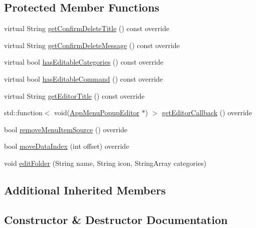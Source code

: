 \subsection*{Protected Member Functions}
\begin{DoxyCompactItemize}
\item 
virtual String \mbox{\hyperlink{classFolderMenuItem_ab3a7232acdc84681c8c31113383471ad}{get\+Confirm\+Delete\+Title}} () const override
\item 
virtual String \mbox{\hyperlink{classFolderMenuItem_ae1961598036e3f731d146257cd556d05}{get\+Confirm\+Delete\+Message}} () const override
\item 
virtual bool \mbox{\hyperlink{classFolderMenuItem_aff205a81de032f9ce018d65391a8d638}{has\+Editable\+Categories}} () const override
\item 
virtual bool \mbox{\hyperlink{classFolderMenuItem_ad38b52ffa7098be2aa8bef09b4013f0e}{has\+Editable\+Command}} () const override
\item 
virtual String \mbox{\hyperlink{classFolderMenuItem_a0cd063b5b374a47a0913ff11c4c1a905}{get\+Editor\+Title}} () const override
\item 
std\+::function$<$ void(\mbox{\hyperlink{classAppMenuPopupEditor}{App\+Menu\+Popup\+Editor}} $\ast$) $>$ \mbox{\hyperlink{classFolderMenuItem_a165416374f830311c0881b568922f9f5}{get\+Editor\+Callback}} () override
\item 
bool \mbox{\hyperlink{classFolderMenuItem_a0cddd7f7e2ac8f27e93861f058ca5094}{remove\+Menu\+Item\+Source}} () override
\item 
bool \mbox{\hyperlink{classFolderMenuItem_a294208ac148dd8af604edea603d9dcf1}{move\+Data\+Index}} (int offset) override
\item 
void \mbox{\hyperlink{classFolderMenuItem_a77305d28e9c8eacbea21e71157f21cf1}{edit\+Folder}} (String name, String icon, String\+Array categories)
\end{DoxyCompactItemize}
\subsection*{Additional Inherited Members}


\subsection{Constructor \& Destructor Documentation}
\mbox{\label{classFolderMenuItem_aa9047739dfc7d9a9c4a88403e2ad416e}} 
